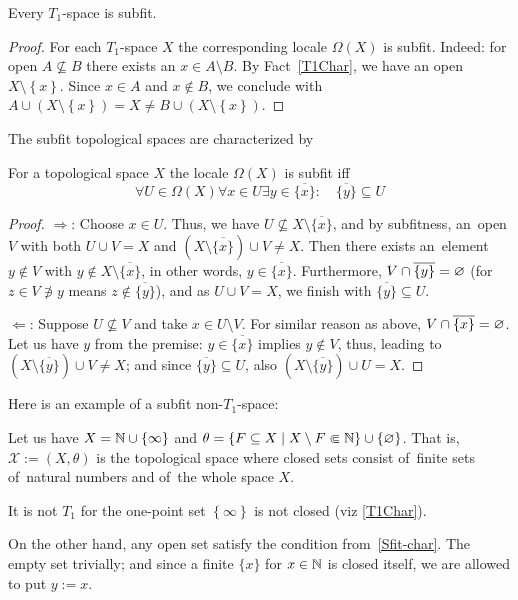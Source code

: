 \begin{thm} \label{T1->Sfit}
  Every $T_1$-space is subfit.
\end{thm}

\begin{proof}
  For each $T_1$-space $X$ the corresponding locale $\Omega(X)$ is subfit.
  Indeed: for open $A\not\subseteq B$ there exists an $x\in A \setminus B$.
  By Fact~\ref{T1Char}\thinspace, we have an open $X\setminus
  \left\{x\right\}$.
  Since $x\in A$ and $x\not\in B$, we conclude with $A\cup (X\setminus
  \left\{x\right\}) = X \ne B \cup (X\setminus \left\{x\right\})$.
\end{proof}

The subfit topological spaces are characterized by

\begin{prop} \label{Sfit-char}
  For a topological space $X$ the locale $\Omega(X)$ is subfit iff
  \[
    \forall U\in\Omega(X) \forall x\in U \exists y\in \overline{\{x\}}: \quad
    \overline{\{y\}} \subseteq U
  \]
\end{prop}
\begin{proof}
  $\Rightarrow$:
  Choose $x \in U$.
  Thus, we have $U\not\subseteq X\setminus \overline{\{x\}}$, and by
  subfitness, an~open $V$ with both $U \cup V = X$ and $(X\setminus
  \overline{\{x\}}) \cup V \ne X$.
  Then there exists an~element $y\not\in V$ with $y\not\in X\setminus
  \overline{\{x\}}$, in other words, $y\in \overline{\{x\}}$.
  Furthermore, $V \cap \overline{\{y\}} = \varnothing$ (for $z \in V \not\owns y$
  means $z\not\in \overline{\{y\}}$), and as $U \cup V = X$, we finish with
  $\overline{\{y\}} \subseteq U$.

  $\Leftarrow$:
  Suppose $U\not\subseteq V$ and take $x\in U\setminus V$.
  For similar reason as above, $V \cap \overline{\{x\}} = \varnothing$.
  Let us have $y$ from the premise:
  $y \in \overline{\{x\}}$ implies  $y\not\in V$, thus, leading to $(X\setminus
  \overline{\{y\}}) \cup V \ne X$;
  and since $\overline{\{y\}} \subseteq U$, also $(X\setminus \overline{\{y\}})
  \cup U = X$.
\end{proof}

Here is an example of a subfit non-$T_1$-space:

\begin{exmpl}
  Let us have $X = \mathbb{N} \cup \left\{\infty\right\}$ and $\theta = \left\{
  F\subseteq X \mid X\setminus F \Subset \mathbb{N} \right\} \cup \left\{ \varnothing
  \right\}$.
  That is, $\mathcal{X} := (X, \theta)$ is the topological space where closed
  sets consist of~finite sets of~natural numbers and of~the whole space $X$.

  It is not $T_1$ for the one-point set $\left\{ \infty \right\}$ is not
  closed (viz \ref{T1Char}).

  On the other hand, any open set satisfy the condition
  from~\ref{Sfit-char}\thinspace.
  The empty set trivially;
  and since a finite $\{x\}$ for $x\in \mathbb{N}$ is closed itself, we are allowed to
  put $y := x$.
\end{exmpl}
